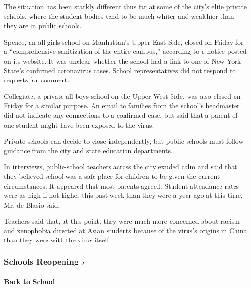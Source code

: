 The situation has been starkly different thus far at some of the city's
elite private schools, where the student bodies tend to be much whiter
and wealthier than they are in public schools.

Spence, an all-girls school on Manhattan's Upper East Side, closed on
Friday for a ``comprehensive sanitization of the entire campus,''
according to a notice posted on its website. It was unclear whether the
school had a link to one of New York State's confirmed coronavirus
cases. School representatives did not respond to requests for comment.

Collegiate, a private all-boys school on the Upper West Side, was also
closed on Friday for a similar purpose. An email to families from the
school's headmaster did not indicate any connections to a confirmed
case, but said that a parent of one student might have been exposed to
the virus.

Private schools can decide to close independently, but public schools
must follow guidance from the
\href{https://www.nytimes3xbfgragh.onion/2020/03/08/nyregion/coronavirus-newyork.html}{city
and state education departments}.

In interviews, public-school teachers across the city exuded calm and
said that they believed school was a safe place for children to be given
the current circumstances. It appeared that most parents agreed: Student
attendance rates were as high if not higher this past week than they
were a year ago at this time, Mr. de Blasio said.

Teachers said that, at this point, they were much more concerned about
racism and xenophobia directed at Asian students because of the virus's
origins in China than they were with the virus itself.

\href{https://www.nytimes3xbfgragh.onion/spotlight/schools-reopening?action=click\&pgtype=Article\&state=default\&region=MAIN_CONTENT_3\&context=storylines_keepup}{}

\hypertarget{schools-reopening-}{%
\subsubsection{Schools Reopening ›}\label{schools-reopening-}}

\hypertarget{back-to-school}{%
\paragraph{Back to School}\label{back-to-school}}

